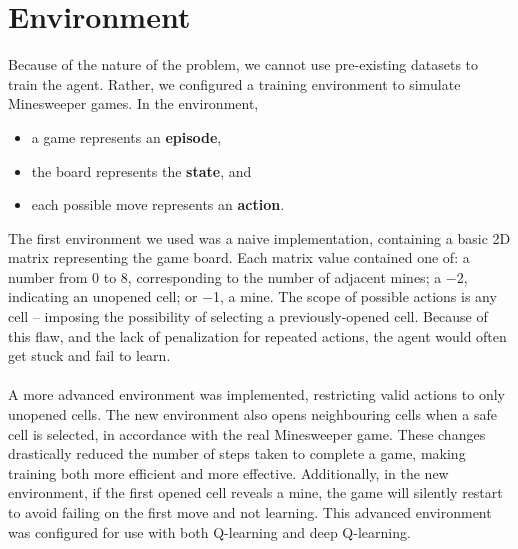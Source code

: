 \section{Environment}
Because of the nature of the problem, we cannot use pre-existing datasets to train the agent. 
Rather, we configured a training environment to simulate Minesweeper games. In the environment,
\begin{itemize}
  \item a game represents an \textbf{episode},
  \item the board represents the \textbf{state}, and
  \item each possible move represents an \textbf{action}.
\end{itemize}
The first environment we used was a naive implementation, containing a basic 2D matrix representing the game board.
Each matrix value contained one of: a number from 0 to 8, corresponding to the number of adjacent mines; a $-$2, indicating an unopened cell; or $-$1, a mine.
The scope of possible actions is any cell -- imposing the possibility of selecting a previously-opened cell.
Because of this flaw, and the lack of penalization for repeated actions, the agent would often get stuck and fail to learn.
\\\\
A more advanced environment was implemented, restricting valid actions to only unopened cells.
The new environment also opens neighbouring cells when a safe cell is selected, in accordance with the real Minesweeper game.
These changes drastically reduced the number of steps taken to complete a game, making training both more efficient and more effective.
Additionally, in the new environment, if the first opened cell reveals a mine, the game will silently restart to avoid failing on the first move and not learning. 
This advanced environment was configured for use with both Q-learning and deep Q-learning.


